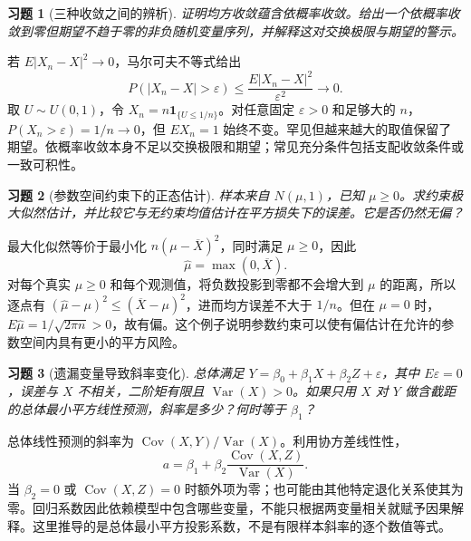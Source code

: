 \documentclass[UTF8,12pt,a4paper,fontset=fandol]{ctexart}
\newtheorem{exercise}{习题}[section]
\begin{document}
\begin{exercise}[三种收敛之间的辨析]\label{q:B17.21}
证明均方收敛蕴含依概率收敛。给出一个依概率收敛到零但期望不趋于零的非负随机变量序列，并解释这对交换极限与期望的警示。\par{}
\end{exercise}

\begin{solve}\label{a:B17.21}若 $E|X_n-X|^2\to0$，马尔可夫不等式给出\[P(|X_n-X|>\varepsilon)\le\frac{E|X_n-X|^2}{\varepsilon^2}\to0.\]取 $U\sim U(0,1)$，令 $X_n=n\mathbf1_{\{U\le1/n\}}$。对任意固定 $\varepsilon>0$ 和足够大的 $n$，$P(X_n>\varepsilon)=1/n\to0$，但 $EX_n=1$ 始终不变。罕见但越来越大的取值保留了期望。依概率收敛本身不足以交换极限和期望；常见充分条件包括支配收敛条件或一致可积性。\end{solve}

\begin{exercise}[参数空间约束下的正态估计]\label{q:B17.22}
样本来自 $N(\mu,1)$，已知 $\mu\ge0$。求约束极大似然估计，并比较它与无约束均值估计在平方损失下的误差。它是否仍然无偏？\par{}
\end{exercise}

\begin{solve}\label{a:B17.22}最大化似然等价于最小化 $n(\mu-\overline X)^2$，同时满足 $\mu\ge0$，因此\[\widehat\mu=\max(0,\overline X).\]对每个真实 $\mu\ge0$ 和每个观测值，将负数投影到零都不会增大到 $\mu$ 的距离，所以逐点有 $(\widehat\mu-\mu)^2\le(\overline X-\mu)^2$，进而均方误差不大于 $1/n$。但在 $\mu=0$ 时，$E\widehat\mu=1/\sqrt{2\pi n}>0$，故有偏。这个例子说明参数约束可以使有偏估计在允许的参数空间内具有更小的平方风险。\end{solve}

\begin{exercise}[遗漏变量导致斜率变化]\label{q:B17.23}
总体满足 $Y=\beta_0+\beta_1X+\beta_2Z+\varepsilon$，其中 $E\varepsilon=0$，误差与 $X$ 不相关，二阶矩有限且 $\operatorname{Var}(X)>0$。如果只用 $X$ 对 $Y$ 做含截距的总体最小平方线性预测，斜率是多少？何时等于 $\beta_1$？\par{}
\end{exercise}

\begin{solve}\label{a:B17.23}总体线性预测的斜率为 $\operatorname{Cov}(X,Y)/\operatorname{Var}(X)$。利用协方差线性性，\[a=\beta_1+\beta_2\frac{\operatorname{Cov}(X,Z)}{\operatorname{Var}(X)}.\]当 $\beta_2=0$ 或 $\operatorname{Cov}(X,Z)=0$ 时额外项为零；也可能由其他特定退化关系使其为零。回归系数因此依赖模型中包含哪些变量，不能只根据两变量相关就赋予因果解释。这里推导的是总体最小平方投影系数，不是有限样本斜率的逐个数值等式。\end{solve}
\end{document}
